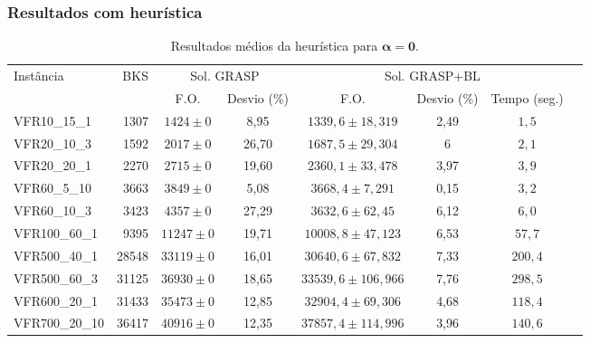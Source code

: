 \documentclass[professionalfonts]{beamer}
\begin{document}
\begin{frame}
   \frametitle{Resultados com heurística}

   \begin{table}[H]
      \centering
      \fontsize{5}{7}\selectfont
      \begin{tabular}{lrcccccc}
         \toprule
         \multirow{2}[2]{*}{Instância} & \multirow{2}[2]{*}{BKS} & \multicolumn{2}{c}{Sol. GRASP} & 
            \multicolumn{3}{c}{Sol. GRASP+BL}\\ \cmidrule(r){3-4} \cmidrule{5-7}
         & & F.O. & Desvio (\%) & F.O. & Desvio (\%) & Tempo (seg.)\\
         \midrule
         VFR10\_15\_1 & 1307 & $1424 \pm 0$ & 8,95 & $1339,6 \pm 18,319$ & 2,49 & $1,5$ \\ 
         VFR20\_10\_3 & 1592 & $2017 \pm 0$ & 26,70 & $1687,5 \pm 29,304$ & 6 & $2,1$ \\ 
         VFR20\_20\_1 & 2270 & $2715 \pm 0$ & 19,60 & $2360,1 \pm 33,478$ & 3,97 & $3,9$ \\ 
         VFR60\_5\_10 & 3663 & $3849 \pm 0$ & 5,08 & $3668,4 \pm 7,291$ & 0,15 & $3,2$ \\ 
         VFR60\_10\_3 & 3423 & $4357 \pm 0$ & 27,29 & $3632,6 \pm 62,45$ & 6,12 &
         $6,0$ \\ 
         VFR100\_60\_1 & 9395  & $11247 \pm 0$ & 19,71 & $10008,8 \pm 47,123$ & 6,53 & $57,7$ \\ 
         VFR500\_40\_1 & 28548 & $33119 \pm 0$ & 16,01 & $30640,6 \pm 67,832$ & 7,33 & $200,4$ \\ 
         VFR500\_60\_3 & 31125 & $36930 \pm 0$ & 18,65 & $33539,6 \pm 106,966$ & 7,76 & $298,5$ \\ 
         VFR600\_20\_1 & 31433 & $35473 \pm 0$ & 12,85 & $32904,4 \pm 69,306$ & 4,68 & $118,4$ \\ 
         VFR700\_20\_10 & 36417 & $40916 \pm 0$ & 12,35 & $37857,4 \pm 114,996$ & 3,96 & $140,6$ \\ 
         \bottomrule
      \end{tabular}
      \caption{Resultados médios da heurística para $\bm{\alpha = 0}$.} 
      \label{table:results-heur-short}
   \end{table}

\end{frame}
\end{document}
